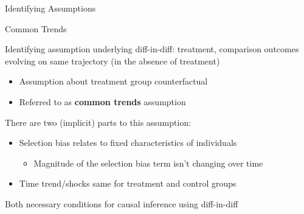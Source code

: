 \documentclass[10pt,xcolor=table,ignorenonframetext,handout,aspectratio=169]{beamer}
\newlength{\wideitemsep}
\let\olditem\item
\renewcommand{\item}{\setlength{\itemsep}{\wideitemsep}\olditem}
\begin{document}

\begin{frame}[plain]

\begin{adjustwidth}{0cm}{-4cm}
	
	\begin{center}
		
		\Large{Identifying Assumptions}
		
	\end{center}
	
\end{adjustwidth}
\end{frame}



\begin{frame}{Common Trends}

\medskip

Identifying assumption underlying diff-in-diff:  treatment, comparison outcomes evolving on same trajectory (in the absence of treatment)

\medskip
\begin{itemize}
	
	\item
	Assumption about treatment group counterfactual 
	
	\item 
	Referred to as \textbf{common trends} assumption
	
\end{itemize}

\pause
\medskip
\medskip

There are two (implicit) parts to this assumption:

\medskip
\begin{itemize}
	
	\item
	Selection bias relates to fixed characteristics of individuals
	
	\medskip
	\begin{itemize}
		
		\item
		Magnitude of the selection bias term isn't changing over time
		
	\end{itemize}
	
	\item
	Time trend/shocks same for treatment and control groups
	
\end{itemize}

\pause
\medskip
\medskip
Both necessary conditions for causal inference using diff-in-diff

\end{frame}
\end{document}
